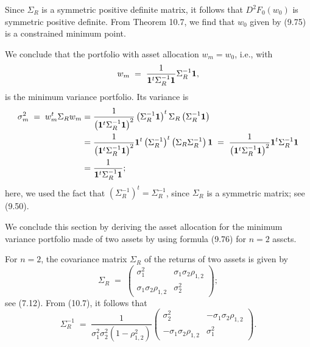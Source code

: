 
Since $\Sigma_R$ is a symmetric positive definite matrix, it follows that
$D^2F_0(w_0)$ is symmetric positive definite. From Theorem 10.7, we find that $w_0$
given by (9.75) is a constrained minimum point.

We conclude that the portfolio with asset allocation $w_m = w_0$, i.e., with
\begin{equation}
w_m \;=\; \frac{1}{\mathbf{1}^t\Sigma_R^{-1}\mathbf{1}}\Sigma_R^{-1}\mathbf{1},
\end{equation}
is the minimum variance portfolio. Its variance is
\begin{align}
\sigma_m^2 \;=\; w_m^t\Sigma_Rw_m &=
\frac{1}{\left(\mathbf{1}^t\Sigma_R^{-1}\mathbf{1}\right)^2}\left(\Sigma_R^{-1}\mathbf{1}\right)^t
\Sigma_R\left(\Sigma_R^{-1}\mathbf{1}\right) \notag\\
&= \frac{1}{\left(\mathbf{1}^t\Sigma_R^{-1}\mathbf{1}\right)^2}
\mathbf{1}^t\left(\Sigma_R^{-1}\right)^t\left(\Sigma_R\Sigma_R^{-1}\right)\mathbf{1} \;=\;
\frac{1}{\left(\mathbf{1}^t\Sigma_R^{-1}\mathbf{1}\right)^2}\mathbf{1}^t\Sigma_R^{-1}\mathbf{1}
\notag\\
&= \frac{1}{\mathbf{1}^t\Sigma_R^{-1}\mathbf{1}};
\end{align}
here, we used the fact that $\left(\Sigma_R^{-1}\right)^t = \Sigma_R^{-1}$, since
$\Sigma_R$ is a symmetric matrix; see (9.50).

We conclude this section by deriving the asset allocation for the minimum variance
portfolio made of two assets by using formula (9.76) for $n=2$ asscts.

For $n=2$, the covariance matrix $\Sigma_R$ of the returns of two assets is given by
\[
\Sigma_R \;=\; \begin{pmatrix} \sigma_1^2 & \sigma_1\sigma_2\rho_{1,2} \\
\sigma_1\sigma_2\rho_{1,2} & \sigma_2^2 \end{pmatrix};
\]
see (7.12). From (10.7), it follows that
\begin{equation}
\Sigma_R^{-1} \;=\; \frac{1}{\sigma_1^2\sigma_2^2(1-\rho_{1,2}^2)}
\begin{pmatrix} \sigma_2^2 & -\sigma_1\sigma_2\rho_{1,2} \\ -\sigma_1\sigma_2\rho_{1,2}
& \sigma_1^2 \end{pmatrix}.
\end{equation}

